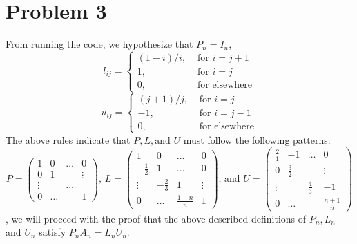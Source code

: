 \documentclass{article}
\begin{document}
\section*{Problem 3}
From running the code, we hypothesize that $P_{n} = I_{n}$, 
\begin{equation*}
l_{ij}=\left\{\begin{array}{lr}
(1-i)/i, & \text { for } i=j+1 \\
1, & \text { for } i=j \\
0, & \text { for elsewhere}
\end{array}\right.
\end{equation*}
\begin{equation*}
u_{ij}=\left\{\begin{array}{lr}
(j+1)/j, & \text { for } i=j \\
-1, & \text { for } i=j-1 \\
0, & \text { for elsewhere}
\end{array}\right.
\end{equation*}
The above rules indicate that $P, L, \text{and } U$ must follow the following patterns:
\begin{equation*}
    P = \begin{pmatrix}
        1 & 0 & \dots & 0\\
        0 & 1 & \ & \vdots \\
        \vdots & & \dots & \\
        0 & \dots & & 1
    \end{pmatrix}\text{, } L = \begin{pmatrix}
        1 & 0 & \dots & 0\\
        -\frac{1}{2} & 1 & \dots & 0 \\
        \vdots & -\frac{2}{3}& 1 & \vdots \\
        0 & \dots & \frac{1-n}{n} & 1
    \end{pmatrix}\text{, and } U = \begin{pmatrix}
        \frac{2}{1} & -1 & \dots & 0\\
        0 & \frac{3}{2} &  & \vdots\\
        \vdots & & \frac{4}{3} & -1\\
        0 &\dots & & \frac{n+1}{n}
        
    \end{pmatrix}
\end{equation*}
, we will proceed with the proof that the above described definitions of $P_{n}, L_{n}$ and $U_{n}$ satisfy $P_{n}A_{n} = L_{n}U_{n}$. 
\end{document}
